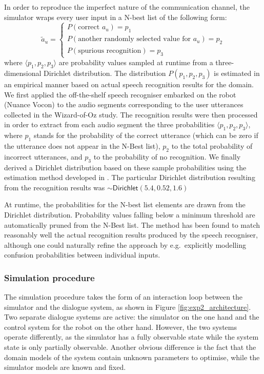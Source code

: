 In order to reproduce the imperfect nature of the communication channel, the simulator wraps every user input in a N-best list of the following form: 
\begin{equation}
\tilde{a}_u = \begin{cases} P(\text{correct } a_u) = p_1 \\ P(\text{another randomly selected value for } a_u) = p_2 \\ P(\text{spurious recognition}) = p_3 \end{cases} \nonumber
\end{equation}
where $\langle p_1, p_2, p_3 \rangle$ are probability values sampled at runtime from a three-dimensional Dirichlet distribution.  The distribution $P(p_1, p_2, p_3)$ is estimated in an empirical manner based on actual speech recognition results for the domain. We first applied the off-the-shelf speech recogniser embarked on the robot (Nuance Vocon) to the audio segments corresponding to the user utterances collected in the Wizard-of-Oz study.  The recognition results were then processed in order to extract from each audio segment the three probabilities $\langle p_1, p_2, p_3 \rangle$, where $p_1$ stands for the probability of the correct utterance (which can be zero if the utterance does not appear in the N-Best list), $p_2$ to the total probability of incorrect utterances, and $p_3$ to the probability of no recognition. We finally derived a Dirichlet distribution based on these sample probabilities using the estimation method developed in \cite{minka2003}.  The particular Dirichlet distribution resulting from the recognition results was $\sim\mathsf{Dirichlet}(5.4, 0.52, 1.6)$

At runtime, the probabilities for the N-best list elements are drawn from the Dirichlet distribution. Probability values falling below a minimum threshold are automatically pruned from the N-Best list. The method has been found to match reasonably well the actual recognition results produced by the speech recogniser, although one could naturally refine the approach by e.g.\ explicitly modelling confusion probabilities between individual inputs. 

\subsubsection*{Simulation procedure}
The simulation procedure takes the form of an interaction loop between the simulator and the dialogue system, as shown in Figure \ref{fig:exp2_architecture}.  Two separate dialogue systems are active: the simulator on the one hand and the control system for the robot on the other hand.  However, the two systems operate differently, as the simulator has a fully observable state while the system state is only partially observable.  Another obvious difference is the fact that the domain models of the system contain unknown parameters to optimise, while the simulator models are known and fixed.

